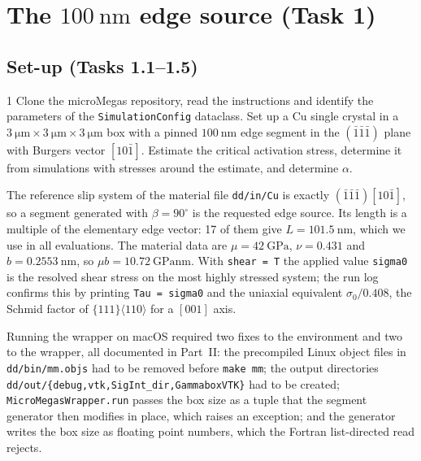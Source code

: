\documentclass[11pt,a4paper]{article}
\numberwithin{equation}{section}
\theoremstyle{remark}
\begin{document}
\section{The $\SI{100}{\nano\metre}$ edge source (Task 1)}\label{sec:task1}

\subsection{Set-up (Tasks 1.1--1.5)}\label{sec:setup}

\begin{task}{1}
  Clone the microMegas repository, read the instructions and identify the parameters of the
  \texttt{SimulationConfig} dataclass. Set up a Cu single crystal in a
  $\SI{3}{\micro\metre}\times\SI{3}{\micro\metre}\times\SI{3}{\micro\metre}$ box with a pinned
  $\SI{100}{\nano\metre}$ edge segment in the $(\bar1\bar1\bar1)$ plane with Burgers vector $[10\bar1]$.
  Estimate the critical activation stress, determine it from simulations with stresses around the
  estimate, and determine $\alpha$.
\end{task}

The reference slip system of the material file \texttt{dd/in/Cu} is exactly $(\bar1\bar1\bar1)[10\bar1]$,
so a segment generated with $\beta = 90^\circ$ is the requested edge source. Its length is a multiple of
the elementary edge vector: 17 of them give $L = \SI{101.5}{\nano\metre}$, which we use in all
evaluations. The material data are $\mu = \SI{42}{\giga\pascal}$, $\nu = 0.431$ and
$b = \SI{0.2553}{\nano\metre}$, so $\mu b = \SI{10.72}{\giga\pascal\nano\metre}$. With \texttt{shear = T}
the applied value \texttt{sigma0} is the resolved shear stress on the most highly stressed system; the
run log confirms this by printing \texttt{Tau = sigma0} and the uniaxial equivalent $\sigma_0/0.408$,
the Schmid factor of $\{111\}\langle110\rangle$ for a $[001]$ axis.

Running the wrapper on macOS required two fixes to the environment and two to the wrapper, all
documented in Part~II: the precompiled Linux object files in \texttt{dd/bin/mm.objs} had to be removed
before \texttt{make mm}; the output directories \texttt{dd/out/\{debug,vtk,SigInt\_dir,GammaboxVTK\}} had
to be created; \texttt{MicroMegasWrapper.run} passes the box size as a tuple that the segment generator
then modifies in place, which raises an exception; and the generator writes the box size as floating
point numbers, which the Fortran list-directed read rejects.
\end{document}
